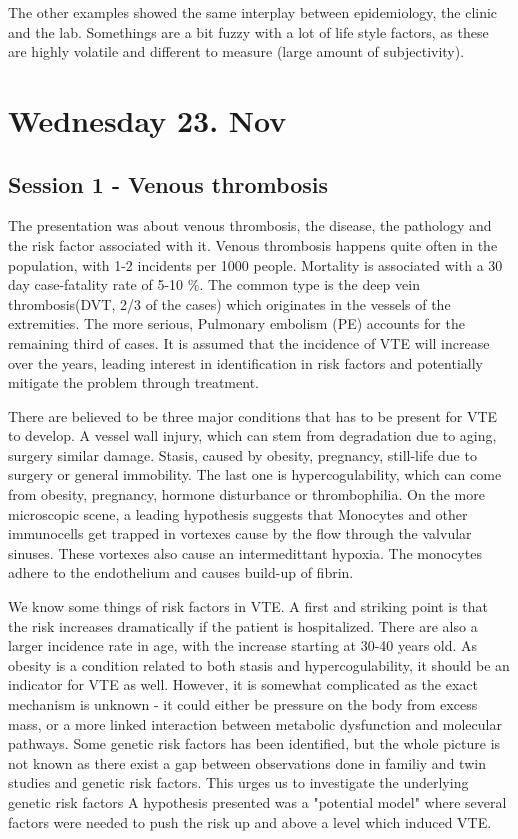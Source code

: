 \documentclass[12p]{article}
\begin{document}
The other examples showed the same interplay between epidemiology, the clinic and the lab.
Somethings are a bit fuzzy with a lot of life style factors, as these are highly volatile and different to measure (large amount of subjectivity).

\section*{Wednesday 23. Nov}
\subsection*{Session 1 - Venous thrombosis}

The presentation was about venous thrombosis, the disease, the pathology and the risk factor associated with it.
Venous thrombosis happens quite often in the population, with 1-2 incidents per 1000 people.
Mortality is associated with a 30 day case-fatality rate of 5-10 \%.
The common type is the deep vein thrombosis(DVT, 2/3 of the cases) which originates in the vessels of the extremities.
The more serious, Pulmonary embolism (PE) accounts for the remaining third of cases.
It is assumed that the incidence of VTE will increase over the years, leading interest in identification in risk factors and potentially mitigate the problem through treatment.

There are believed to be three major conditions that has to be present for VTE to develop.
A vessel wall injury, which can stem from degradation due to aging, surgery similar damage.
Stasis, caused by obesity, pregnancy, still-life due to surgery or general immobility.
The last one is hypercogulability, which can come from obesity, pregnancy, hormone disturbance or thrombophilia.
On the more microscopic scene, a leading hypothesis suggests that Monocytes and other immunocells get trapped in vortexes cause by the flow through the valvular sinuses.
These vortexes also cause an intermedittant hypoxia.
The monocytes adhere to the endothelium and causes build-up of fibrin.

We know some things of risk factors in VTE.
A first and striking point is that the risk increases dramatically if the patient is hospitalized.
There are also a larger incidence rate in age, with the increase starting at 30-40 years old.
As obesity is a condition related to both stasis and hypercogulability, it should be an indicator for VTE as well.
However, it is somewhat complicated as the exact mechanism is unknown - it could either be pressure on the body from excess mass, or a more linked interaction between metabolic dysfunction and molecular pathways.
Some genetic risk factors has been identified, but the whole picture is not known as there exist a gap between observations done in familiy and twin studies and genetic risk factors.
This urges us to investigate the underlying genetic risk factors
A hypothesis presented was a "potential model" where several factors were needed to push the risk up and above a level which induced VTE.
\end{document}
